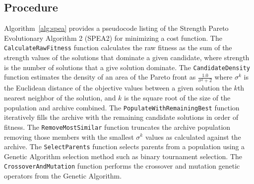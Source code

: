 \subsection{Procedure}
Algorithm~\ref{alg:spea} provides a pseudocode listing of the Strength Pareto Evolutionary Algorithm 2 (SPEA2) for minimizing a cost function. 
The \texttt{CalculateRawFitness} function calculates the raw fitness as the sum of the strength values of the solutions that dominate a given candidate, where strength is the number of solutions that a give solution dominate.
The \texttt{CandidateDensity} function estimates the density of an area of the Pareto front as $\frac{1.0}{\sigma^k + 2}$ where $\sigma^k$ is the Euclidean distance of the objective values between a given solution the $k$th nearest neighbor of the solution, and $k$ is the square root of the size of the population and archive combined.
The \texttt{PopulateWithRemainingBest} function iteratively fills the archive with the remaining candidate solutions in order of fitness.
The \texttt{RemoveMostSimilar} function truncates the archive population removing those members with the smallest $\sigma^k$ values as calculated against the archive.
The \texttt{SelectParents} function selects parents from a population using a Genetic Algorithm selection method such as binary tournament selection. The \texttt{CrossoverAndMutation} function performs the crossover and mutation genetic operators from the Genetic Algorithm.

